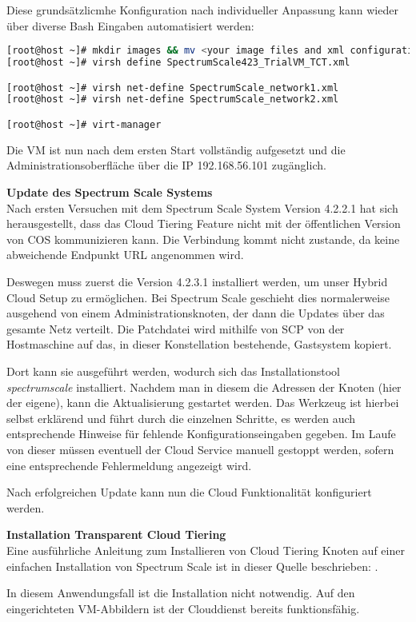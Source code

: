Diese grundsätzlicmhe Konfiguration nach individueller Anpassung kann wieder über diverse Bash Eingaben automatisiert werden: \\

\begin{lstlisting}[language=bash, caption=Portierung des VM Abbilds]
[root@host ~]# mkdir images && mv <your image files and xml configuration> images
[root@host ~]# virsh define SpectrumScale423_TrialVM_TCT.xml 

[root@host ~]# virsh net-define SpectrumScale_network1.xml
[root@host ~]# virsh net-define SpectrumScale_network2.xml

[root@host ~]# virt-manager
\end{lstlisting}

Die VM ist nun nach dem ersten Start vollständig aufgesetzt und die Administrationsoberfläche über die IP 192.168.56.101 zugänglich.

\textbf{Update des Spectrum Scale Systems}\\
Nach ersten Versuchen mit dem Spectrum Scale System Version 4.2.2.1 hat sich herausgestellt, dass das Cloud Tiering Feature nicht mit der öffentlichen Version von \acs{COS} kommunizieren kann. Die Verbindung kommt nicht zustande, da keine abweichende Endpunkt URL angenommen wird.

Deswegen muss zuerst die Version 4.2.3.1 installiert werden, um unser Hybrid Cloud Setup zu ermöglichen. Bei Spectrum Scale geschieht dies normalerweise ausgehend von einem Administrationsknoten, der dann die Updates über das gesamte Netz verteilt. Die Patchdatei wird mithilfe von \ac{SCP} von der Hostmaschine auf das, in dieser Konstellation bestehende, Gastsystem kopiert.	

Dort kann sie ausgeführt werden, wodurch sich das Installationstool \textit{spectrumscale} installiert. Nachdem man in diesem die Adressen der Knoten (hier der eigene), kann die Aktualisierung gestartet werden. Das Werkzeug ist hierbei selbst erklärend und führt durch die einzelnen Schritte, es werden auch entsprechende Hinweise für fehlende Konfigurationseingaben gegeben.
Im Laufe von dieser müssen eventuell der Cloud Service manuell gestoppt werden, sofern eine entsprechende Fehlermeldung angezeigt wird.

Nach erfolgreichen Update kann nun die Cloud Funktionalität konfiguriert werden.

\textbf{Installation Transparent Cloud Tiering}\\

Eine ausführliche Anleitung zum Installieren von Cloud Tiering Knoten auf einer einfachen Installation von Spectrum Scale ist in dieser Quelle beschrieben: \cite{mani.2017}.

In diesem Anwendungsfall ist die Installation nicht notwendig. Auf den eingerichteten VM-Abbildern ist der Clouddienst bereits funktionsfähig.

